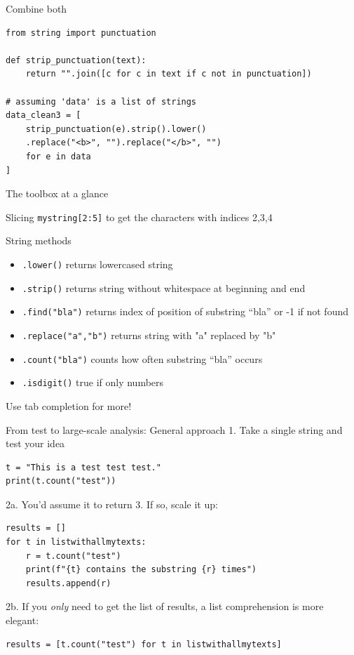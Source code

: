 \begin{frame}[fragile]{Combine both}
\begin{verbatim}
from string import punctuation

def strip_punctuation(text):
    return "".join([c for c in text if c not in punctuation])

# assuming 'data' is a list of strings
data_clean3 = [
    strip_punctuation(e).strip().lower()
    .replace("<b>", "").replace("</b>", "")
    for e in data
]
\end{verbatim}    
\end{frame}



\begin{frame}{The toolbox at a glance}
  \footnotesize
\begin{block}{Slicing}
\texttt{mystring[2:5]} to get the characters with indices 2,3,4
\end{block}

\begin{block}{String methods}
\begin{itemize}
	\item \texttt{.lower()} returns lowercased string
	\item \texttt{.strip()} returns string without whitespace at beginning and end
	\item \texttt{.find("bla")} returns index of position of substring ``bla'' or -1 if not found
	\item \texttt{.replace("a","b")} returns string with "a" replaced by "b"
	\item \texttt{.count("bla")} counts how often substring ``bla'' occurs
        \item \texttt{.isdigit()} true if only numbers
          
\end{itemize}
Use tab completion for more!
\end{block}
\end{frame}




\begin{frame}[fragile]{From test to large-scale analysis: General approach}
1. Take a single string and test your idea
\begin{lstlisting}
t = "This is a test test test."
print(t.count("test"))
\end{lstlisting}
2a. You'd assume it to return 3. If so, scale it up:
\begin{lstlisting}
results = []
for t in listwithallmytexts:
    r = t.count("test")
    print(f"{t} contains the substring {r} times")
    results.append(r)
\end{lstlisting}

2b. If you \emph{only} need to get the list of results, a list comprehension is more elegant:
\begin{lstlisting}
results = [t.count("test") for t in listwithallmytexts]
\end{lstlisting}


\end{frame}


